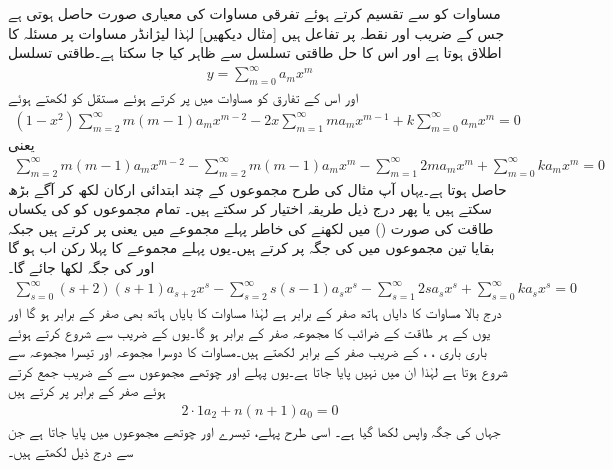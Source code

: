 مساوات  کو  سے تقسیم کرتے ہوئے تفرقی مساوات کی معیاری صورت حاصل ہوتی ہے جس کے  ضریب   اور  نقطہ  پر  تفاعل ہیں [مثال  دیکھیں] لہٰذا لیژانڈر مساوات پر مسئلہ  کا اطلاق ہوتا ہے اور اس کا حل طاقتی تسلسل سے ظاہر کیا جا سکتا ہے۔طاقتی تسلسل
\begin{align}\label{مساوات_بیسل_لیژانڈر_حل_الف}
y=\sum_{m=0}^{\infty}a_mx^m
\end{align}
اور اس کے تفارق کو مساوات  میں پر کرتے  ہوئے مستقل  کو  لکھتے ہوئے
\begin{align*}
(1-x^2)\sum_{m=2}^{\infty}m(m-1)a_mx^{m-2}-2x\sum_{m=1}^{\infty}ma_mx^{m-1}+k\sum_{m=0}^{\infty}a_mx^m=0
\end{align*}
یعنی
\begin{align*}
\sum_{m=2}^{\infty}m(m-1)a_mx^{m-2}-\sum_{m=2}^{\infty}m(m-1)a_mx^m-\sum_{m=1}^{\infty}2ma_mx^{m}+\sum_{m=0}^{\infty}ka_mx^m=0
\end{align*}
حاصل ہوتا ہے۔یہاں آپ مثال  کی طرح مجموعوں کے چند ابتدائی ارکان لکھ کر آگے بڑھ سکتے ہیں یا پھر درج ذیل طریقہ اختیار کر سکتے ہیں۔ تمام مجموعوں کو   کی یکساں طاقت کی صورت () میں لکھنے کی خاطر پہلے مجموعے میں  یعنی  پر کرتے ہیں جبکہ بقایا تین مجموعوں میں  کی جگہ  پر کرتے ہیں۔یوں پہلے مجموعے کا پہلا رکن  اب  ہو گا اور  کی جگہ  لکھا جائے گا۔
\begin{align}\label{مساوات_بیسل_لیژانڈر_ب}
\sum_{s=0}^{\infty}(s+2)(s+1)a_{s+2}x^{s}-\sum_{s=2}^{\infty}s(s-1)a_sx^s-\sum_{s=1}^{\infty}2s a_sx^s+\sum_{s=0}^{\infty}ka_s x^s=0
\end{align}
درج بالا مساوات کا دایاں ہاتھ صفر کے برابر ہے لہٰذا مساوات کا بایاں ہاتھ بھی صفر کے برابر ہو گا اور یوں  کے ہر طاقت کے ضرائب کا مجموعہ صفر کے برابر ہو گا۔یوں  کے  ضریب  سے شروع کرتے ہوئے باری باری ، ،  کے  ضریب  صفر کے برابر لکھتے ہیں۔مساوات  کا دوسرا مجموعہ  اور تیسرا مجموعہ  سے شروع ہوتا ہے لہٰذا ان میں  نہیں پایا جاتا ہے۔یوں پہلے اور چوتھے مجموعوں سے  کے  ضریب  جمع کرتے ہوئے صفر کے برابر پر کرتے ہیں
\begin{align}\label{مساوات_بیسل_لیژانڈر_پ}
2 \cdot 1 a_2+n(n+1)a_0=0
\end{align}
جہاں  کی جگہ واپس  لکھا گیا ہے۔ اسی طرح  پہلے، تیسرے اور چوتھے مجموعوں میں پایا جاتا ہے جن سے درج ذیل لکھتے ہیں۔
